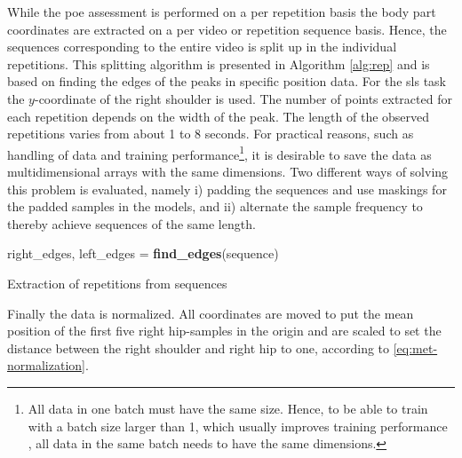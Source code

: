 While the \gls{poe} assessment is performed on a per repetition basis the body part coordinates are extracted on a per video or repetition sequence basis. Hence, the sequences corresponding to the entire video is split up in the individual repetitions. This splitting algorithm is presented in Algorithm \ref{alg:rep} and is based on finding the edges of the peaks in specific position data. For the \gls{sls} task the $y$-coordinate of the right shoulder is used. The number of points extracted for each repetition depends on the width of the peak. The length of the observed repetitions varies from about 1 to 8 seconds. For practical reasons, such as handling of data and training performance\footnote{All data in one batch must have the same size. Hence, to be able to train with a batch size larger than 1, which usually improves training performance \cite{Goodfellow2016}, all data in the same batch needs to have the same dimensions.}, it is desirable to save the data as multidimensional arrays with the same dimensions. Two different ways of solving this problem is evaluated, namely i) padding the sequences and use maskings for the padded samples in the models, and ii) alternate the sample frequency to thereby achieve sequences of the same length.

\begin{algorithm}
\SetAlgoLined
right\_edges, left\_edges = \textbf{find\_edges}(sequence)\;
 \For{\textup{peak, right, current\_left, next\_left} in \textup{peaks, right\_edges, left\_edges}}{
  split\_index = \textbf{mean}(right, next\_left)\;
  start = \textbf{max}(current\_left - extra\_points, 0)\;
  end = \textbf{min}(right + extra\_points, split\_index)\;
  \textit{repetition} = \textbf{normalize\_length}(sequence[start:end])\;
  sequence = sequence[end:]\;
 }
 \caption{Extraction of repetitions from sequences}
 \label{alg:rep}
\end{algorithm}


Finally the data is normalized. All coordinates are moved to put the mean position of the first five right hip-samples in the origin and are scaled to set the distance between the right shoulder and right hip to one, according to \eqref{eq:met-normalization}.

